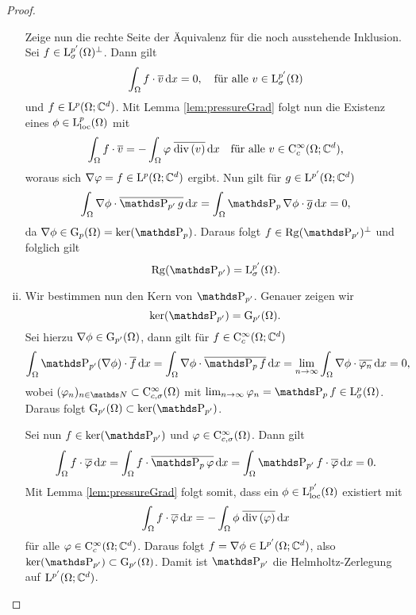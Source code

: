 \begin{proof}
\begin{enumerate}[(i)]
$$  $$
  Zeige nun die rechte Seite der Äquivalenz für die noch ausstehende Inklusion.
  Sei $f \in \mathrm{L}^{p'}_\sigma(\Omega)^\perp$.
  Dann gilt
  $$
  \int_\Omega f \cdot \overline v \, {\operatorname{d}\!{x}} = 0, \quad\text{für alle } v \in \mathrm{L}_\sigma^{p'}(\Omega)
  $$
  und $f \in \mathrm{L}^p(\Omega; \mathbb{C}^d)$.
  Mit Lemma \ref{lem:pressureGrad} folgt nun die Existenz eines $\phi \in \mathrm{L}^p_{\operatorname{loc}}(\Omega)$ mit
  $$
  \int_\Omega f \cdot \overline v = - \int_\Omega \varphi \; \overline{\mathrm{div\,} (v)} \, {\operatorname{d}\!{x}} \quad\text{für alle } v \in \mathrm{C}_c^\infty(\Omega; \mathbb{C}^d),
  $$
  woraus sich $\nabla\varphi = f \in \mathrm{L}^p(\Omega; \mathbb{C}^d)$ ergibt.
  Nun gilt für $g \in \mathrm{L}^{p'}(\Omega; \mathbb{C}^d)$
  $$
  \int_\Omega \nabla\phi \cdot \overline{\PP_{p'} g} \d x = \int_\Omega \PP_p\nabla \phi \cdot \overline g \d x = 0,
  $$
  da $\nabla \phi \in \GG_p(\Omega) = \ker(\PP_p)$.
  Daraus folgt $f \in \Rg(\PP_{p'})^\perp$ und folglich gilt 
  $$
  \Rg(\PP_{p'}) = \Ell_\sigma^{p'}(\Omega).
  $$
\item Wir bestimmen nun den Kern von $\PP_{p'}$.
  Genauer zeigen wir
  $$
  \ker(\PP_{p'}) = \GG_{p'}(\Omega).
  $$
  Sei hierzu $\nabla \phi \in \mathrm{G}_{p'}(\Omega)$, dann gilt für $f \in \mathrm{C}_c^\infty(\Omega; \mathbb{C}^d)$
  $$
  \int_\Omega \PP_{p'}(\nabla\phi) \cdot \overline f \d x
  = \int_\Omega \nabla \phi \cdot \overline{\PP_p f} \d x
  = \lim_{n \to \infty} \int_\Omega \nabla \phi \cdot \overline{\varphi_n} \d x
  = 0,
  $$
  wobei $(\varphi_n)_{n \in \N} \subset \CC_{c,\sigma}^\infty(\Omega)$ mit $\lim_{n \to \infty} \varphi_n = \PP_p f \in \Ell^p_\sigma(\Omega)$.
  Daraus folgt $\GG_{p'}(\Omega) \subset \ker(\PP_{p'})$.

  Sei nun $f \in \ker(\PP_{p'})$ und $\varphi \in \mathrm{C}^\infty_{c,\sigma}(\Omega)$.
  Dann gilt
  $$
  \int_\Omega f \cdot \overline\varphi \d x 
  = \int_\Omega f \cdot \overline{\PP_p \varphi} \d x
  = \int_\Omega \PP_{p'} f \cdot \overline{\varphi} \d x = 0.
  $$
  Mit Lemma \ref{lem:pressureGrad} folgt somit, dass ein $\phi \in \mathrm{L}_{\operatorname{loc}}^{p'}(\Omega)$ existiert mit 
  $$
  \int_\Omega f \cdot \overline\varphi \, {\operatorname{d}\!{x}}
  = -\int_\Omega \phi \; \overline{\mathrm{div\,} (\varphi)} \, {\operatorname{d}\!{x}}
  $$
  für alle $\varphi \in \mathrm{C}_c^\infty(\Omega; \mathbb{C}^d)$.
  Daraus folgt $f = \nabla\phi \in \mathrm{L}^{p'}(\Omega; \mathbb{C}^d)$, also $\ker(\PP_{p'}) \subset \GG_{p'}(\Omega)$.
  Damit ist $\PP_{p'}$ die Helmholtz-Zerlegung auf $\mathrm{L}^{p'}(\Omega; \mathbb{C}^d)$.


\end{enumerate}
\end{proof}
